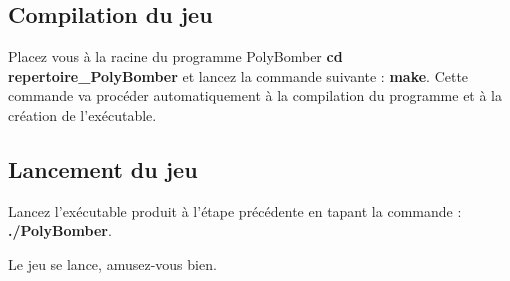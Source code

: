 \subsection{Compilation du jeu}
	Placez vous à la racine du programme PolyBomber \textbf{cd repertoire\_PolyBomber} et lancez la commande suivante : \textbf{make}.
Cette commande va procéder automatiquement à la compilation du programme et à la création de l'exécutable.


\subsection{Lancement du jeu}
	Lancez l'exécutable produit à l'étape précédente en tapant la commande : \textbf{./PolyBomber}.
	
	
\begin{center}	
	Le jeu se lance, amusez-vous bien.
\end{center}
